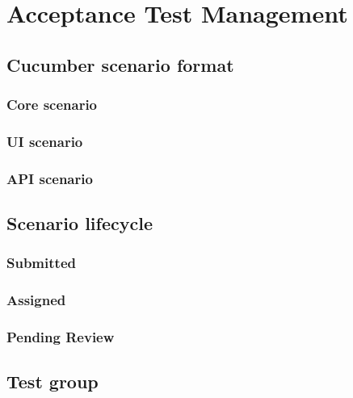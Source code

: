 \section{Acceptance Test Management}\label{sec:acceptance-test-management}

\subsection{Cucumber scenario format}\label{subsec:cucumber-scenario-management}

\subsubsection{Core scenario}

\subsubsection{UI scenario}

\subsubsection{API scenario}

\subsection{Scenario lifecycle}\label{subsec:scenario-lifecycle}

\subsubsection{Submitted}

\subsubsection{Assigned}

\subsubsection{Pending Review}

\subsection{Test group}\label{subsec:test-group}

